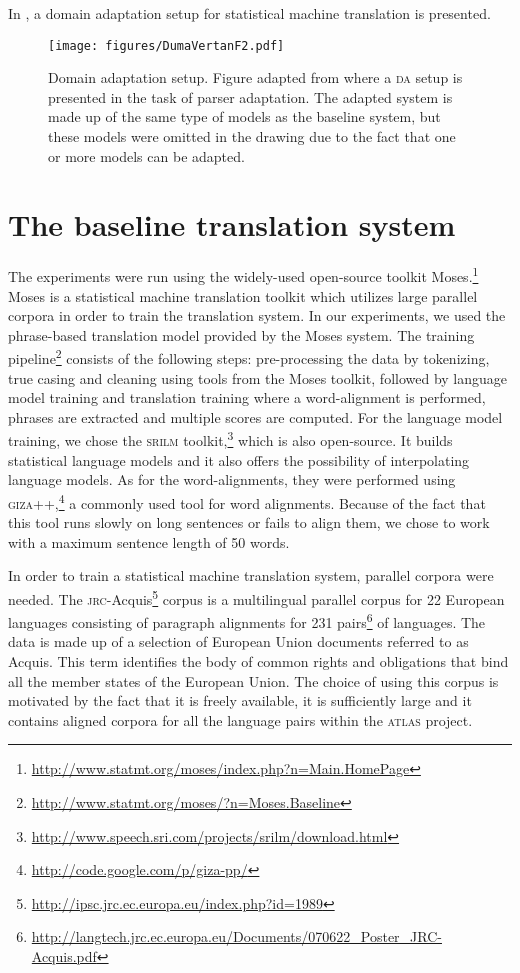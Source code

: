 \documentclass[output=paper]{LSP/langsci}
\begin{document}
In , a domain adaptation setup for statistical machine translation is presented.

\begin{figure}
\texttt{[image: figures/DumaVertanF2.pdf]}
\caption{Domain adaptation setup. Figure adapted from \citet[Chapter~3]{Plank2011} where a \textsc{da} setup is presented in the task of parser adaptation. The adapted system is made up of the same type of models as the baseline system, but these models were omitted in the drawing due to the fact that one or more models can be adapted.}
\label{fig:dumavertan:2}
\end{figure}

\section{The baseline translation system}\label{sec:dumavertan:4}
The experiments were run using the widely-used open-source toolkit Moses.\footnote{\url{http://www.statmt.org/moses/index.php?n=Main.HomePage}} Moses is a statistical machine translation toolkit which utilizes large parallel corpora in order to train the translation system. In our experiments, we used the phrase-based translation model provided by the Moses system. The training pipeline\footnote{\url{http://www.statmt.org/moses/?n=Moses.Baseline}} consists of the following steps: pre-processing the data by tokenizing, true casing and cleaning using tools from the Moses toolkit, followed by language model training and translation training where a word-alignment is performed, phrases are extracted and multiple scores are computed. For the language model training, we chose the \textsc{srilm} toolkit,\footnote{\url{http://www.speech.sri.com/projects/srilm/download.html}} which is also open-source. It builds statistical language models and it also offers the possibility of interpolating language models. As for the word-alignments, they were performed using \textsc{giza++},\footnote{\url{http://code.google.com/p/giza-pp/}} a commonly used tool for word alignments. Because of the fact that this tool runs slowly on long sentences or fails to align them, we chose to work with a maximum sentence length of 50 words.

In order to train a statistical machine translation system, parallel corpora were needed. The \textsc{jrc}-Acquis\footnote{\url{http://ipsc.jrc.ec.europa.eu/index.php?id=1989}} corpus is a multilingual parallel corpus for 22 European languages consisting of paragraph alignments for 231 pairs\footnote{\url{http://langtech.jrc.ec.europa.eu/Documents/070622\_Poster\_JRC-Acquis.pdf}} of languages. The data is made up of a selection of European Union documents referred to as Acquis. This term identifies the body of common rights and obligations that bind all the member states of the European Union. The choice of using this corpus is motivated by the fact that it is freely available, it is sufficiently large and it contains aligned corpora for all the language pairs within the \textsc{atlas} project. 
\end{document}
